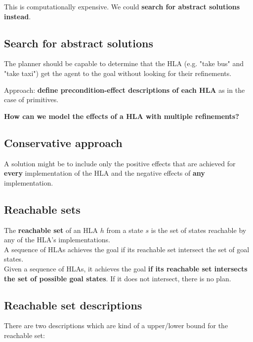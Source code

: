 \documentclass{article}
\begin{document}
\begin{itemize}
This is computationally expensive. We could \textbf{search for abstract solutions instead}.

\subsection{Search for abstract solutions}

The planner should be capable to determine that the HLA (e.g. "take bus" and "take taxi") get the agent to the goal without looking for their refinements. \\

\begin{center}
    Approach: \textbf{define precondition-effect descriptions of each HLA} as in the case of primitives.
\end{center}

\textbf{How can we model the effects of a HLA with multiple refinements?}

\subsection{Conservative approach}

A solution might be to include only the positive effects that are achieved for \textbf{every} implementation of the HLA and the negative effects of \textbf{any} implementation.

\newpage

\subsection{Reachable sets}

The \textbf{reachable set} of an HLA $h$ from a state $s$ is the set of states reachable by any of the HLA's implementations. \\

A sequence of HLAs achieves the goal if its reachable set intersect the set of goal states. \\

Given a sequence of HLAs, it achieves the goal \textbf{if its reachable set intersects the set of possible goal states}. If it does not intersect, there is no plan.

\subsection{Reachable set descriptions}

There are two descriptions which are kind of a upper/lower bound for the reachable set:


\end{itemize}
\end{document}
